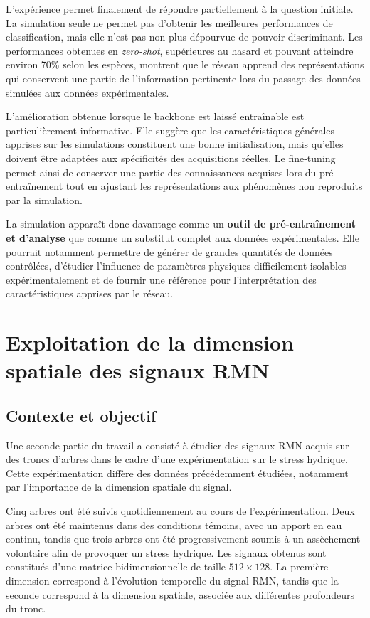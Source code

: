 \documentclass[12pt,a4paper,twoside]{article}
\begin{document}
L'expérience permet finalement de répondre partiellement à la question initiale. La simulation seule ne permet pas d'obtenir les meilleures performances de classification, mais elle n'est pas non plus dépourvue de pouvoir discriminant. Les performances obtenues en \textit{zero-shot}, supérieures au hasard et pouvant atteindre environ \num{70}\% selon les espèces, montrent que le réseau apprend des représentations qui conservent une partie de l'information pertinente lors du passage des données simulées aux données expérimentales.

L'amélioration obtenue lorsque le backbone est laissé entraînable est particulièrement informative. Elle suggère que les caractéristiques générales apprises sur les simulations constituent une bonne initialisation, mais qu'elles doivent être adaptées aux spécificités des acquisitions réelles. Le fine-tuning permet ainsi de conserver une partie des connaissances acquises lors du pré-entraînement tout en ajustant les représentations aux phénomènes non reproduits par la simulation.

La simulation apparaît donc davantage comme un \textbf{outil de pré-entraînement et d'analyse} que comme un substitut complet aux données expérimentales. Elle pourrait notamment permettre de générer de grandes quantités de données contrôlées, d'étudier l'influence de paramètres physiques difficilement isolables expérimentalement et de fournir une référence pour l'interprétation des caractéristiques apprises par le réseau.

\section{Exploitation de la dimension spatiale des signaux RMN}
\label{sec:signaux_2d}

\subsection{Contexte et objectif}
\label{subsec:contexte_2d}

Une seconde partie du travail a consisté à étudier des signaux RMN acquis sur des troncs d'arbres dans le cadre d'une expérimentation sur le stress hydrique. Cette expérimentation diffère des données précédemment étudiées, notamment par l'importance de la dimension spatiale du signal.

Cinq arbres ont été suivis quotidiennement au cours de l'expérimentation. Deux arbres ont été maintenus dans des conditions témoins, avec un apport en eau continu, tandis que trois arbres ont été progressivement soumis à un assèchement volontaire afin de provoquer un stress hydrique. Les signaux obtenus sont constitués d'une matrice bidimensionnelle de taille $512 \times 128$. La première dimension correspond à l'évolution temporelle du signal RMN, tandis que la seconde correspond à la dimension spatiale, associée aux différentes profondeurs du tronc.
\end{document}
